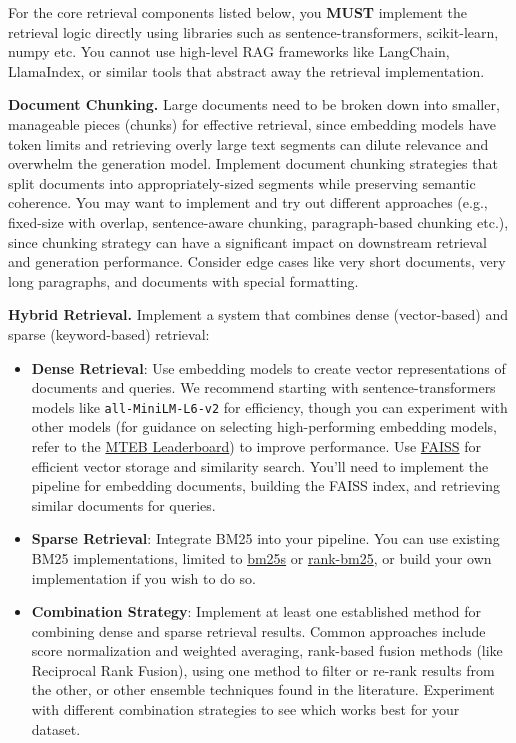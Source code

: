 \documentclass[11pt]{article}
\begin{document}
\vspace{0.5em}
\noindent For the core retrieval components listed below, you \textbf{MUST} implement the retrieval
logic directly using libraries such as sentence-transformers, scikit-learn, numpy etc. You cannot use
high-level RAG frameworks like LangChain, LlamaIndex, or similar tools that abstract away the
retrieval implementation.

\vspace{0.6em}
\noindent\textbf{Document Chunking.} Large documents need to be broken down into smaller, manageable
pieces (chunks) for effective retrieval, since embedding models have token limits and retrieving
overly large text segments can dilute relevance and overwhelm the generation model. Implement
document chunking strategies that split documents into appropriately-sized segments while preserving
semantic coherence. You may want to implement and try out different approaches (e.g., fixed-size with
overlap, sentence-aware chunking, paragraph-based chunking etc.), since chunking strategy can have a
significant impact on downstream retrieval and generation performance. Consider edge cases like very
short documents, very long paragraphs, and documents with special formatting.

\vspace{0.6em}
\noindent\textbf{Hybrid Retrieval.} Implement a system that combines dense (vector-based) and sparse
(keyword-based) retrieval:

\begin{itemize}[nosep, leftmargin=2em]
  \item \textbf{Dense Retrieval}: Use embedding models to create vector representations of documents
    and queries. We recommend starting with sentence-transformers models like
    \texttt{all-MiniLM-L6-v2} for efficiency, though you can experiment with other models (for
    guidance on selecting high-performing embedding models, refer to the
    \href{https://huggingface.co/spaces/mteb/leaderboard}{MTEB Leaderboard}) to improve performance.
    Use \href{https://github.com/facebookresearch/faiss}{FAISS} for efficient vector storage and
    similarity search. You'll need to implement the pipeline for embedding documents, building the
    FAISS index, and retrieving similar documents for queries.
  \item \textbf{Sparse Retrieval}: Integrate BM25 into your pipeline. You can use existing BM25
    implementations, limited to \href{https://github.com/xhluca/bm25s}{bm25s} or
    \href{https://pypi.org/project/rank-bm25/}{rank-bm25}, or build your own implementation if you
    wish to do so.
  \item \textbf{Combination Strategy}: Implement at least one established method for combining dense
    and sparse retrieval results. Common approaches include score normalization and weighted
    averaging, rank-based fusion methods (like Reciprocal Rank Fusion), using one method to filter or
    re-rank results from the other, or other ensemble techniques found in the literature. Experiment
    with different combination strategies to see which works best for your dataset.
\end{itemize}
\end{document}
